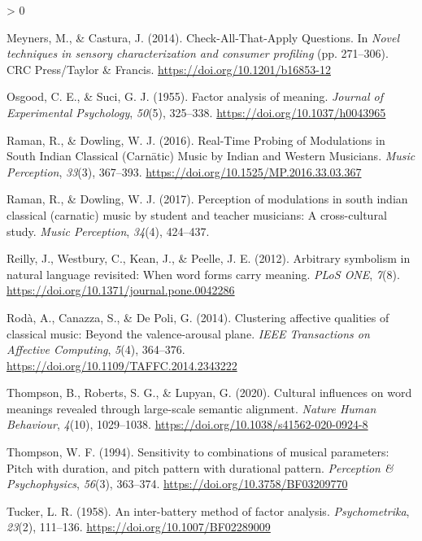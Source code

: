 \documentclass[
  english,
  man,floatsintext]{apa6}
\newlength{\cslhangindent}
\newenvironment{CSLReferences}[2] %
 {%
  \setlength{\parindent}{0pt}
  \ifodd #1 \everypar{\setlength{\hangindent}{\cslhangindent}}\ignorespaces\fi
  \ifnum #2 > 0
  \setlength{\parskip}{#2\baselineskip}
  \fi
 }%
 {}
\begin{document}
\begin{CSLReferences}{1}{0}
\leavevmode\hypertarget{ref-Meyners2014}{}%
Meyners, M., \& Castura, J. (2014). {Check-All-That-Apply Questions}. In \emph{Novel techniques in sensory characterization and consumer profiling} (pp. 271--306). CRC Press/Taylor {\&} Francis. \url{https://doi.org/10.1201/b16853-12}

\leavevmode\hypertarget{ref-Osgood1955}{}%
Osgood, C. E., \& Suci, G. J. (1955). {Factor analysis of meaning}. \emph{Journal of Experimental Psychology}, \emph{50}(5), 325--338. \url{https://doi.org/10.1037/h0043965}

\leavevmode\hypertarget{ref-Raman2016}{}%
Raman, R., \& Dowling, W. J. (2016). {Real-Time Probing of Modulations in South Indian Classical (Carnātic) Music by Indian and Western Musicians}. \emph{Music Perception}, \emph{33}(3), 367--393. \url{https://doi.org/10.1525/MP.2016.33.03.367}

\leavevmode\hypertarget{ref-Raman2017}{}%
Raman, R., \& Dowling, W. J. (2017). {Perception of modulations in south indian classical (carnatic) music by student and teacher musicians: A cross-cultural study}. \emph{Music Perception}, \emph{34}(4), 424--437.

\leavevmode\hypertarget{ref-Reilly2012}{}%
Reilly, J., Westbury, C., Kean, J., \& Peelle, J. E. (2012). {Arbitrary symbolism in natural language revisited: When word forms carry meaning}. \emph{PLoS ONE}, \emph{7}(8). \url{https://doi.org/10.1371/journal.pone.0042286}

\leavevmode\hypertarget{ref-Roda2014}{}%
Rodà, A., Canazza, S., \& De Poli, G. (2014). {Clustering affective qualities of classical music: Beyond the valence-arousal plane}. \emph{IEEE Transactions on Affective Computing}, \emph{5}(4), 364--376. \url{https://doi.org/10.1109/TAFFC.2014.2343222}

\leavevmode\hypertarget{ref-Thompson2020}{}%
Thompson, B., Roberts, S. G., \& Lupyan, G. (2020). {Cultural influences on word meanings revealed through large-scale semantic alignment}. \emph{Nature Human Behaviour}, \emph{4}(10), 1029--1038. \url{https://doi.org/10.1038/s41562-020-0924-8}

\leavevmode\hypertarget{ref-Thompson1994}{}%
Thompson, W. F. (1994). {Sensitivity to combinations of musical parameters: Pitch with duration, and pitch pattern with durational pattern}. \emph{Perception {\&} Psychophysics}, \emph{56}(3), 363--374. \url{https://doi.org/10.3758/BF03209770}

\leavevmode\hypertarget{ref-Tucker1958}{}%
Tucker, L. R. (1958). {An inter-battery method of factor analysis}. \emph{Psychometrika}, \emph{23}(2), 111--136. \url{https://doi.org/10.1007/BF02289009}


\end{CSLReferences}
\end{document}

